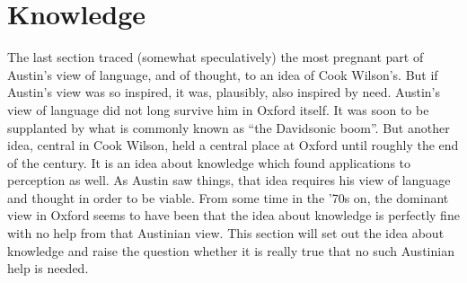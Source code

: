 \section{Knowledge} %
\label{sec:knowledge}

The last section traced (somewhat speculatively) the most pregnant part of Austin's view of language, and of thought, to an idea of Cook Wilson's. But if Austin's view was so inspired, it was, plausibly, also inspired by need. Austin's view of language did not long survive him in Oxford itself. It was soon to be supplanted by what is commonly known as ``the Davidsonic boom''. But another idea, central in Cook Wilson, held a central place at Oxford until roughly the end of the century. It is an idea about knowledge which found applications to perception as well. As Austin saw things, that idea requires his view of language and thought in order to be viable. From some time in the '70s on, the dominant view in Oxford seems to have been that the idea about knowledge is perfectly fine with no help from that Austinian view. This section will set out the idea about knowledge and raise the question whether it is really true that no such Austinian help is needed.

